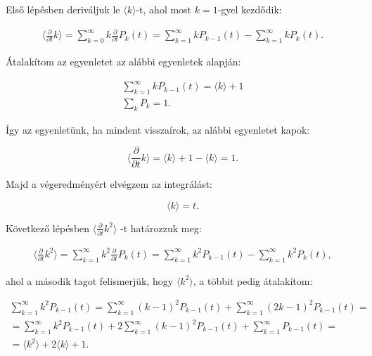 \documentclass[a4paper, 12pt]{article}
\numberwithin{equation}{section}          %
\numberwithin{figure}{subsection}
\begin{document}
Első lépésben deriváljuk le $\langle k \rangle$-t, ahol most $k = 1$-gyel kezdődik:

\begin{center}
	\begin{gather*}
	\langle \frac{\partial}{\partial t} k \rangle = \sum_{k =0}^{\infty}k \frac{\partial}{\partial t}P_k(t) = \sum_{k = 1}^{\infty}kP_{k-1}(t) - \sum_{k = 1}^{\infty}kP_k(t).
	\end{gather*}
\end{center}

Átalakítom az egyenletet az alábbi egyenletek alapján:

\begin{center}
	\begin{gather*}
	\sum_{k = 1}^{\infty}kP_{k-1}(t) = \langle k \rangle +1 \\
	\sum_k P_k = 1. 
	\end{gather*}
\end{center}

Így az egyenletünk, ha mindent visszaírok, az alábbi egyenletet kapok:

\begin{center}
	\begin{equation}
		\langle \frac{\partial}{\partial t}k \rangle = \langle k \rangle + 1 - \langle k \rangle = 1. 
	\end{equation}
\end{center}

Majd a végeredményért elvégzem az integrálást:

\begin{center}
	\begin{equation}
	\langle k \rangle = t. 
	\end{equation}
\end{center}

Következő lépésben $\langle \frac{\partial}{\partial t}k^2 \rangle$ -t határozzuk meg:
\begin{center}
	\begin{gather}
	\langle \frac{\partial}{\partial t}k^2 \rangle = \sum_{k = 1}^{\infty} k^2 \frac{\partial}{\partial t}P_k(t) = \sum_{k = 1}^{\infty} k^2 P_{k-1}(t) - \sum_{k = 1}^{\infty} k^2 P_k(t),
	\end{gather}
\end{center}

ahol a második tagot felismerjük, hogy $\langle k^2\rangle$, a többit pedig átalakítom:

\begin{center}
	\begin{gather*}
	\sum_{k = 1}^{\infty}k^2 P_{k-1}(t) = \sum_{k = 1}^{\infty}(k-1)^2 P_{k-1}(t) + \sum_{k = 1}^{\infty}(2k-1)^2 P_{k-1}(t) =\\
	= \sum_{k = 1}^{\infty}k^2 P_{k-1}(t) + 2\sum_{k = 1}^{\infty}(k-1)^2 P_{k-1}(t) + \sum_{k = 1}^{\infty} P_{k-1}(t) = \\
	=\langle k^2 \rangle + 2\langle k\rangle +1.
	\end{gather*}
\end{center}
\end{document}
